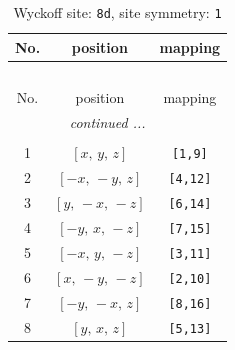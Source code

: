 \documentclass[fleqn,8pt]{jsarticle}
\begin{document}
\renewcommand{\arraystretch}{1.2}
\begin{longtable}{ccc}
\caption{Wyckoff site: {\tt 8d}, site symmetry: {\tt 1}}
 \\
 \hline \hline
No. & position & mapping \\ \hline \endfirsthead

\multicolumn{2}{l}{\tablename\ \thetable{}} \\
 \hline \hline
No. & position & mapping \\ \hline \endhead

 \hline \hline
\multicolumn{2}{r}{\footnotesize\it continued ...} \\ \endfoot

 \hline \hline
\multicolumn{2}{r}{} \\ \endlastfoot

1 & $\left[ x,\, y,\, z \right]$ & {\tt [1,9]} \\ \hline
2 & $\left[ - x,\, - y,\, z \right]$ & {\tt [4,12]} \\ \hline
3 & $\left[ y,\, - x,\, - z \right]$ & {\tt [6,14]} \\ \hline
4 & $\left[ - y,\, x,\, - z \right]$ & {\tt [7,15]} \\ \hline
5 & $\left[ - x,\, y,\, - z \right]$ & {\tt [3,11]} \\ \hline
6 & $\left[ x,\, - y,\, - z \right]$ & {\tt [2,10]} \\ \hline
7 & $\left[ - y,\, - x,\, z \right]$ & {\tt [8,16]} \\ \hline
8 & $\left[ y,\, x,\, z \right]$ & {\tt [5,13]} \\
\end{longtable}
\end{document}
